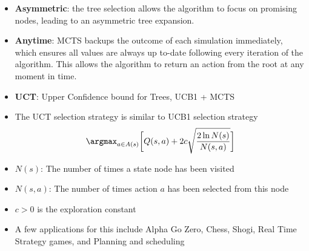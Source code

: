 \documentclass[a4paper]{article}
\begin{document}
\begin{itemize}
    \item \textbf{Asymmetric}: the tree selection allows the algorithm to focus on promising nodes, leading to an asymmetric tree expansion.
    \item \textbf{Anytime}: MCTS backups the outcome of each simulation immediately, which ensures all values are always up to-date following every iteration of the algorithm. This allows the algorithm to return an action from the root at any moment in time.
    \item \textbf{UCT}: Upper Confidence bound for Trees, UCB1 + MCTS
    \item The UCT selection strategy is similar to UCB1 selection strategy
    \begin{equation*}
        \argmax_{a\in A(s)}\bigg[Q(s,a)+2c\sqrt{\frac{2\ln{N(s)}}{N(s,a)}}\bigg]
    \end{equation*}
    \item $N(s)$: The number of times a state node has been visited
    \item $N(s,a)$: The number of times action $a$ has been selected from this node
    \item $c>0$ is the exploration constant
    \item A few applications for this include Alpha Go Zero, Chess, Shogi, Real Time Strategy games, and Planning and scheduling
\end{itemize}
\end{document}
